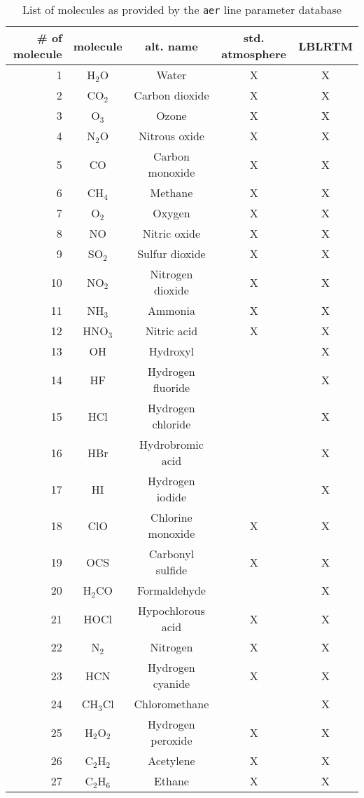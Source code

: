 \begin{table*}[!ht]
\begin{center}
\caption{List of molecules as provided by the {\tt aer} line parameter database}
\label{tab:molecs}
\vspace{6pt}
\centering
\begin{tabular}{r | c | c | c | c}     %
\hline\hline
\# of molecule & molecule & alt. name & std. atmosphere & \ac{LBLRTM} \\
\hline
1 & H$_2$O & Water & X & X \\
2 & CO$_2$ & Carbon dioxide & X & X \\
3 & O$_3$  & Ozone & X & X \\
4 & N$_2$O & Nitrous oxide & X & X \\
5 & CO  & Carbon monoxide & X & X \\
\hline
6 & CH$_4$ & Methane & X & X \\
7 & O$_2$  & Oxygen & X & X \\
8 & NO  & Nitric oxide & X & X \\
9 & SO$_2$ & Sulfur dioxide & X & X \\
10 & NO$_2$ & Nitrogen dioxide & X & X \\
\hline
11 & NH$_3$  & Ammonia & X & X \\
12 & HNO$_3$ & Nitric acid & X & X \\
13 & OH   & Hydroxyl &  & X \\
14 & HF   & Hydrogen fluoride &  & X \\
15 & HCl  & Hydrogen chloride &  & X \\
\hline
16 & HBr  & Hydrobromic acid &  & X \\
17 & HI   & Hydrogen iodide &  & X \\
18 & ClO  & Chlorine monoxide & X & X \\
19 & OCS  & Carbonyl sulfide & X & X \\
20 & H$_2$CO & Formaldehyde &  & X \\
\hline
21 & HOCl & Hypochlorous acid & X & X \\
22 & N$_2$   & Nitrogen & X & X \\
23 & HCN  & Hydrogen cyanide & X & X \\
24 & CH$_3$Cl & Chloromethane &  & X \\
25 & H$_2$O$_2$ & Hydrogen peroxide & X & X \\
\hline
26 & C$_2$H$_2$ & Acetylene & X & X \\
27 & C$_2$H$_6$ & Ethane & X & X \\

\end{tabular}
\end{center}
\end{table*}
